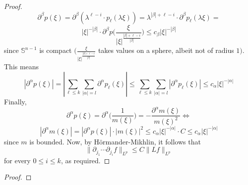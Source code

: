 \documentclass[12pt]{article}
\newenvironment{exercise}[2][Exercise]{\begin{trivlist}
\item[\hskip \labelsep {\bfseries #1}\hskip \labelsep {\bfseries #2.}]}{\end{trivlist}}
\begin{document}
\begin{proof}
  $$
    \partial^\beta p(\xi) =
    \partial^\beta(\lambda^{\ell - i} \cdot p_\ell(\lambda \xi)) =
    \lambda^{|\beta| + \ell -i} \cdot \partial^\beta p_\ell(\lambda \xi)  =
  $$
  $$
    |\xi|^{-|\beta|} \cdot \partial^\beta p \Bigg( \frac{\xi}{|\xi|^{\frac{|\beta| + \ell -i}{|\beta|}}} \Bigg) \le
    c_\beta |\xi|^{-|\beta|}
  $$
  since $\mathbb{S}^{n-1}$ is compact $\Big(\frac{\xi}{|\xi|^{\frac{|\beta| + \ell -i}{|\beta|}}}$ takes values on a sphere, albeit not of radius $1 \Big)$.\\
  This means
  $$
    |\partial^\alpha p(\xi)| =
    |\sum_{\ell \le k} \sum_{|\alpha| = l} \partial^\alpha p_\ell(\xi)| \le
    \sum_{\ell \le k} \sum_{|\alpha| = l} |\partial^\alpha p_\ell(\xi)| \le
    c_\alpha |\xi|^{-|\alpha|}
  $$
  Finally,
  $$
    \partial^\alpha p(\xi) =
    \partial^\alpha \Big( \frac{1}{m(\xi)} \Big) =
    -\dfrac{\partial^\alpha m(\xi)}{m(\xi)^2} \iff
  $$
  $$
    |\partial^\alpha m(\xi)| =
    |\partial^\alpha p(\xi)| \cdot |m(\xi)|^2 \le
    c_\alpha |\xi|^{-|\alpha|} \cdot C \le
    c_\alpha |\xi|^{-|\alpha|}
  $$
  since $m$ is bounded. Now, by Hörmander-Mikhlin, it follows that
  $$
    \|\partial_{j_1} \cdots \partial_{j_i} f\|_{L^p} \le
    C \|Lf\|_{L^p}
  $$
  for every $0 \le i \le k$, as required.
\end{proof}

\begin{exercise}{3}
\end{exercise}

\begin{proof}

\end{proof}
\end{document}
